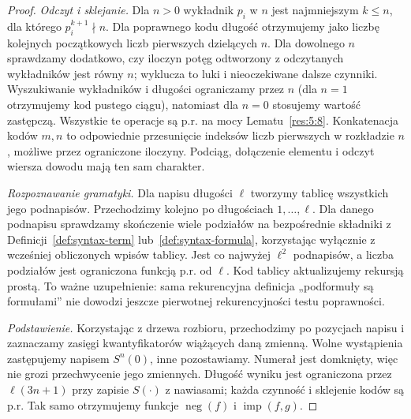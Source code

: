 \begin{proof}
\emph{Odczyt i sklejanie.} Dla $n>0$ wykładnik $p_i$ w $n$ jest najmniejszym $k\le n$, dla którego $p_i^{k+1}\nmid n$. Dla poprawnego kodu długość otrzymujemy jako liczbę kolejnych początkowych liczb pierwszych dzielących $n$. Dla dowolnego $n$ sprawdzamy dodatkowo, czy iloczyn potęg odtworzony z odczytanych wykładników jest równy $n$; wyklucza to luki i nieoczekiwane dalsze czynniki. Wyszukiwanie wykładników i długości ograniczamy przez $n$ (dla $n=1$ otrzymujemy kod pustego ciągu), natomiast dla $n=0$ stosujemy wartość zastępczą. Wszystkie te operacje są p.r. na mocy Lematu~\ref{res:5:8}. Konkatenacja kodów $m,n$ to odpowiednie przesunięcie indeksów liczb pierwszych w rozkładzie $n$, możliwe przez ograniczone iloczyny. Podciąg, dołączenie elementu i odczyt wiersza dowodu mają ten sam charakter.

\emph{Rozpoznawanie gramatyki.} Dla napisu długości $\ell$ tworzymy tablicę wszystkich jego podnapisów. Przechodzimy kolejno po długościach $1,\ldots,\ell$. Dla danego podnapisu sprawdzamy skończenie wiele podziałów na bezpośrednie składniki z Definicji~\ref{def:syntax-term} lub~\ref{def:syntax-formula}, korzystając wyłącznie z wcześniej obliczonych wpisów tablicy. Jest co najwyżej $\ell^2$ podnapisów, a liczba podziałów jest ograniczona funkcją p.r. od $\ell$. Kod tablicy aktualizujemy rekursją prostą. To ważne uzupełnienie: sama rekurencyjna definicja „podformuły są formułami” nie dowodzi jeszcze pierwotnej rekurencyjności testu poprawności.

\emph{Podstawienie.} Korzystając z drzewa rozbioru, przechodzimy po pozycjach napisu i zaznaczamy zasięgi kwantyfikatorów wiążących daną zmienną. Wolne wystąpienia zastępujemy napisem $S^n(0)$, inne pozostawiamy. Numerał jest domknięty, więc nie grozi przechwycenie jego zmiennych. Długość wyniku jest ograniczona przez $\ell(3n+1)$ przy zapisie $S(\cdot)$ z nawiasami; każda czynność i sklejenie kodów są p.r. Tak samo otrzymujemy funkcje $\operatorname{neg}(f)$ i $\operatorname{imp}(f,g)$.


\end{proof}

